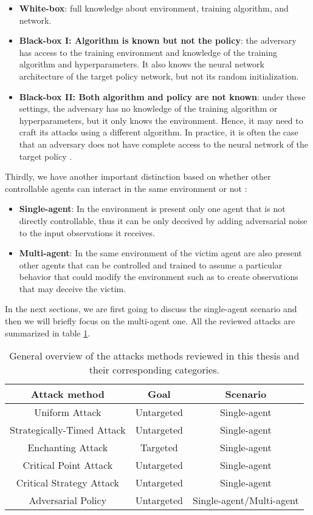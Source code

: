 \begin{itemize}
    \item \textbf{White-box}: full knowledge about environment, training algorithm, and network.
    \item \textbf{Black-box I: Algorithm is known but not the policy}: the adversary has access to the training environment and knowledge of the training algorithm and hyperparameters. It also knows the neural network architecture of the target policy network, but not its random initialization. 
    \item \textbf{Black-box II: Both algorithm and policy are not known}: under these settings, the adversary has no knowledge of the training algorithm or hyperparameters, but it only knows the environment. Hence, it may need to craft its attacks using a different algorithm. In practice, it is often the case that an adversary does not have complete access to the neural network of the target policy \cite{huang2017adversarial}.
\end{itemize}
Thirdly, we have another important distinction based on whether other controllable agents can interact in the same environment or not \cite{gleave2020adversarial}: 
\begin{itemize}
    \item \textbf{Single-agent}: In the environment is present only one agent that is not directly controllable, thus it can be only deceived by adding adversarial noise to the input observations it receives.
    \item \textbf{Multi-agent}: In the same environment of the victim agent are also present other agents that can be controlled and trained to assume a particular behavior that could modify the environment such as to create observations that may deceive the victim.
\end{itemize}
In the next sections, we are first going to discuss the single-agent scenario and then we will briefly focus on the multi-agent one. All the reviewed attacks are summarized in table \ref{table:1}.

\begin{table}
  \centering
  \caption{General overview of the attacks methods reviewed in this thesis and their corresponding categories.}
  \begin{tabular}{ccc}
    \toprule
    Attack method & Goal & Scenario               \\
    \midrule
    Uniform Attack & Untargeted & Single-agent \\ 
    Strategically-Timed Attack & Untargeted & Single-agent \\
    Enchanting Attack & Targeted & Single-agent \\
    Critical Point Attack & Untargeted & Single-agent\\
    Critical Strategy Attack & Untargeted & Single-agent\\
    Adversarial Policy & Untargeted & Single-agent/Multi-agent\\
    \bottomrule
  \end{tabular}
  \label{table:1}
\end{table}

